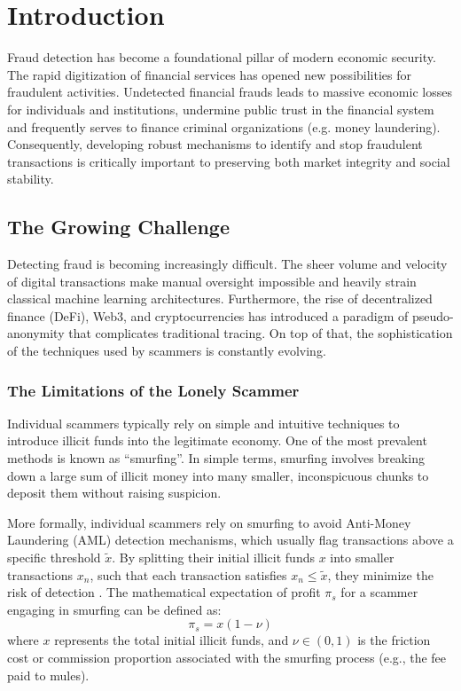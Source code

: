 \chapter{Introduction}
\label{ch:introduction}

Fraud detection has become a foundational pillar of modern economic security. The rapid digitization of financial services has opened new possibilities for fraudulent activities. Undetected financial frauds leads to massive economic losses for individuals and institutions, undermine public trust in the financial system and frequently serves to finance criminal organizations (e.g. money laundering). Consequently, developing robust mechanisms to identify and stop fraudulent transactions is critically important to preserving both market integrity and social stability.

\section{The Growing Challenge}
Detecting fraud is becoming increasingly difficult. The sheer volume and velocity of digital transactions make manual oversight impossible and heavily strain classical machine learning architectures. Furthermore, the rise of decentralized finance (DeFi), Web3, and cryptocurrencies has introduced a paradigm of pseudo-anonymity that complicates traditional tracing. 
On top of that, the sophistication of the techniques used by scammers is constantly evolving.

\subsection{The Limitations of the Lonely Scammer}
Individual scammers typically rely on simple and intuitive techniques to introduce illicit funds into the legitimate economy. One of the most prevalent methods is known as ``smurfing''. In simple terms, smurfing involves breaking down a large sum of illicit money into many smaller, inconspicuous chunks to deposit them without raising suspicion. 

More formally, individual scammers rely on smurfing to avoid Anti-Money Laundering (AML) detection mechanisms, which usually flag transactions above a specific threshold $\tilde{x}$. By splitting their initial illicit funds $x$ into smaller transactions $x_n$, such that each transaction satisfies $x_n \leq \tilde{x}$, they minimize the risk of detection \cite{contreras2026strategic}. The mathematical expectation of profit $\pi_s$ for a scammer engaging in smurfing can be defined as:
\begin{equation}
    \pi_s = x(1-\nu)
\end{equation}
where $x$ represents the total initial illicit funds, and $\nu \in (0,1)$ is the friction cost or commission proportion associated with the smurfing process (e.g., the fee paid to mules). 

